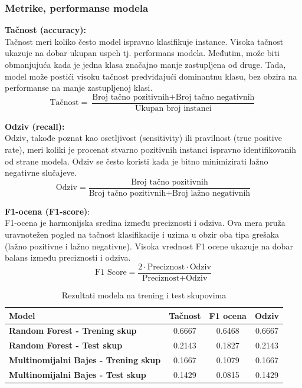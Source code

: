 \documentclass{article}
\begin{document}
\subsubsection{Metrike, performanse modela} 
\begin{flushleft}
\textbf{Tačnost (accuracy):} \\
Tačnost meri koliko često model ispravno klasifikuje instance. Visoka tačnost ukazuje na dobar ukupan uspeh tj. performans modela.  Međutim, može biti obmanjujuća kada je jedna klasa značajno manje zastupljena od druge. Tada, model može postići visoku tačnost predviđajući dominantnu klasu, bez obzira na performanse na manje zastupljenoj klasi.\\
\[
\text{Tačnost} = \frac{\text{Broj tačno pozitivnih} + \text{Broj tačno negativnih}}{\text{Ukupan broj instanci}}
\]\vspace{1mm}


\textbf{Odziv (recall):}\\
Odziv, takođe poznat kao osetljivost (sensitivity) ili pravilnost (true positive rate), meri koliki je procenat stvarno pozitivnih instanci ispravno identifikovanih od strane modela. Odziv se često koristi kada je bitno minimizirati lažno negativne slučajeve.\\


\[
\text{Odziv} = \frac{\text{Broj tačno pozitivnih}}{\text{Broj tačno pozitivnih} + \text{Broj lažno negativnih}}
\]\vspace{1mm}

\textbf{F1-ocena (F1-score)}:\\
F1-ocena je harmonijska sredina između preciznosti i odziva. Ova mera pruža uravnotežen pogled na tačnost klasifikacije i uzima u obzir oba tipa grešaka (lažno pozitivne i lažno negativne). Visoka vrednost F1 ocene ukazuje na dobar balans između preciznosti i odziva.\\
\[
\text{F1 Score} = \frac{2 \cdot \text{Preciznost} \cdot \text{Odziv}}{\text{Preciznost} + \text{Odziv}}
\] 





\begin{center}
\begin{table}[h]
\centering
\begin{tabular}{lccc}
\hline
\textbf{Model} & \textbf{Tačnost} & \textbf{F1 ocena} & \textbf{Odziv} \\
\hline
\textbf{Random Forest - Trening skup} & 0.6667 & 0.6468 & 0.6667 \\
\textbf{Random Forest - Test skup} & 0.2143 & 0.1827 & 0.2143 \\
\textbf{Multinomijalni Bajes - Trening skup} & 0.1667 & 0.1079 & 0.1667 \\
\textbf{Multinomijalni Bajes - Test skup} & 0.1429 & 0.0815 & 0.1429 \\
\hline
\end{tabular}
\caption*{Rezultati modela na trening i test skupovima}
\label{tab:rezultati}
\end{table}



\end{center}
\end{flushleft}
\end{document}
